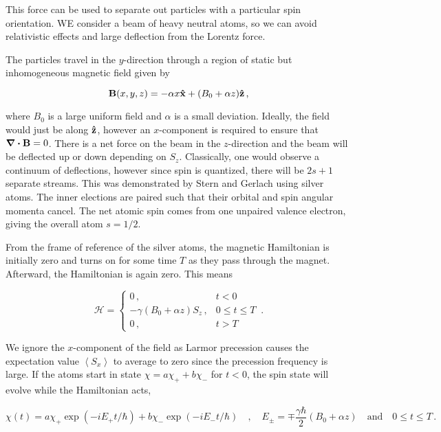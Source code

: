 \documentclass[12pt, titlepage]{article}
\newcommand{\exv}[1]{\left\langle #1 \right\rangle}
\begin{document}
This force can be used to separate out particles with a particular spin orientation. WE consider a beam of heavy neutral atoms, so we can avoid relativistic effects and large deflection from the Lorentz force. 


The particles travel in the $y$-direction through a region of static but inhomogeneous magnetic field given by

\begin{equation}
	\vb{B}(x, y, z) = -\alpha x \vu{x} + (B_0 + \alpha z)\vu{z} \,,
\end{equation}

where $B_0$ is a large uniform field and $\alpha$ is a small deviation. Ideally, the field would just be along $\vu{z}$, however an $x$-component is required to ensure that $\div{\vb{B}} = 0$. There is a net force on the beam in the $z$-direction and the beam will be deflected up or down depending on $S_z$. Classically, one would observe a continuum of deflections, however since spin is quantized, there will be $2s+1$ separate streams. This was demonstrated by Stern and Gerlach using silver atoms. The inner elections are paired such that their orbital and spin angular momenta cancel. The net atomic spin comes from one unpaired valence electron, giving the overall atom $s=1/2$.

From the frame of reference of the silver atoms, the magnetic Hamiltonian is initially zero and turns on for some time $T$ as they pass through the magnet. Afterward, the Hamiltonian is again zero. This means

\begin{equation}
	\mathcal{H} = \left\{
	\begin{array}{ll}
	0 \,, & t<0 \\
	-\gamma(B_0 +\alpha z)S_z \,, & 0 \leq t \leq T \\
	0 \,, & t > T 
	\end{array}
	\right. \, .
\end{equation}

We ignore the $x$-component of the field as Larmor precession causes the expectation value $\exv{S_x}$ to average to zero since the precession frequency is large. If the atoms start in state $\chi = a\chi_+ + b\chi_-$ for $t<0$, the spin state will evolve while the Hamiltonian acts,

\begin{equation*}
	\chi(t) = a\chi_+\exp(-iE_+ t/\hbar) + b\chi_-\exp(-iE_- t/\hbar) \quad,\quad E_\pm = \mp\frac{\gamma\hbar}{2}(B_0+\alpha z) \quad\text{and}\quad 0 \leq t \leq T \,.
\end{equation*}
\end{document}
